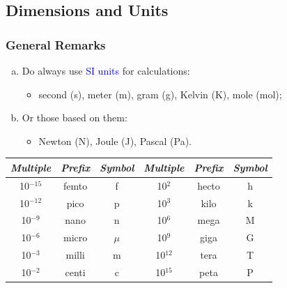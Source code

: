 \documentclass[10pt,compress]{beamer}
\begin{document}
\subsection{Dimensions and Units}
\begin{frame}
 \frametitle{General Remarks}
  \begin{enumerate}[(a)]
   \item <1-> Do always use \textcolor{blue}{SI units} for calculations:
     \begin{itemize}
       \item<1-> second (s), meter (m), gram (g), Kelvin (K), mole (mol);
     \end{itemize}
   \item<2-> Or those based on them:
     \begin{itemize}
       \item<4-> Newton (N), Joule (J), Pascal (Pa).
     \end{itemize}
  \end{enumerate}

  \begin{center}
    \begin{tabular}{c c c | c c c}
      \hline
      {\it Multiple} & {\it Prefix} & {\it Symbol} & {\it Multiple} & {\it Prefix} & {\it Symbol} \\
      \hline
      10$^{-15}$      & femto        & f            &   10$^{2}$     &  hecto       & h            \\
      10$^{-12}$      & pico         & p            &   10$^{3}$     &  kilo        & k            \\
      10$^{-9}$       & nano         & n            &   10$^{6}$     &  mega        & M            \\
      10$^{-6}$       & micro        & $\mu$        &   10$^{9}$     &  giga        & G            \\
      10$^{-3}$       & milli        & m            &   10$^{12}$    &  tera        & T            \\
      10$^{-2}$       & centi        & c            &   10$^{15}$    &  peta        & P            \\
      \hline
    \end{tabular}
  \end{center}
\end{frame}


\end{document}
